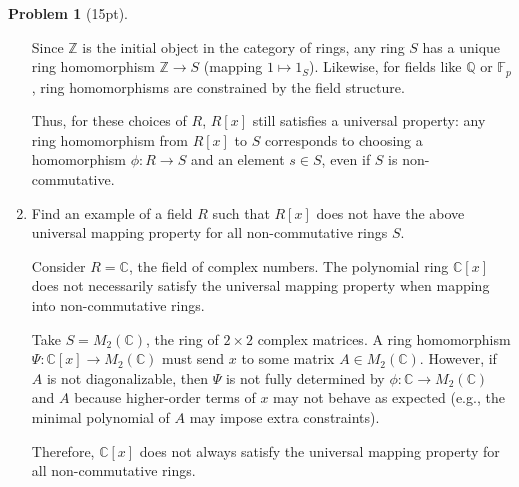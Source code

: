 \documentclass[12pt]{article}
\theoremstyle{definition}
\newtheorem{problem}{Problem}
\begin{document}
\begin{problem}[15pt]
\begin{enumerate}[label=\arabic*.]
\begin{solution}
            Since $\mathbb{Z}$ is the initial object in the category of rings, any ring $S$ has a unique ring homomorphism $\mathbb{Z} \to S$ (mapping $1 \mapsto 1_S$). Likewise, for fields like $\mathbb{Q}$ or $\mathbb{F}_p$, ring homomorphisms are constrained by the field structure.
            
            Thus, for these choices of $R$, $R[x]$ still satisfies a universal property: any ring homomorphism from $R[x]$ to $S$ corresponds to choosing a homomorphism $\phi: R \to S$ and an element $s \in S$, even if $S$ is non-commutative.
            \end{solution}

            \item Find an example of a field $R$ such that $R[x]$ does not have the above universal
                  mapping property for all non-commutative rings $S$.

            \begin{solution}
            Consider $R = \mathbb{C}$, the field of complex numbers. The polynomial ring $\mathbb{C}[x]$ does not necessarily satisfy the universal mapping property when mapping into non-commutative rings.
            
            Take $S = M_2(\mathbb{C})$, the ring of $2 \times 2$ complex matrices. A ring homomorphism $\Psi: \mathbb{C}[x] \to M_2(\mathbb{C})$ must send $x$ to some matrix $A \in M_2(\mathbb{C})$. However, if $A$ is not diagonalizable, then $\Psi$ is not fully determined by $\phi: \mathbb{C} \to M_2(\mathbb{C})$ and $A$ because higher-order terms of $x$ may not behave as expected (e.g., the minimal polynomial of $A$ may impose extra constraints). 
            
            Therefore, $\mathbb{C}[x]$ does not always satisfy the universal mapping property for all non-commutative rings.
            \end{solution}
      \end{enumerate}
\end{problem}
\end{document}
